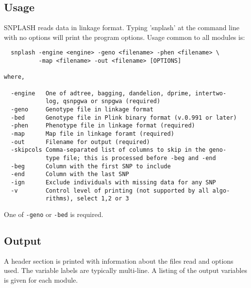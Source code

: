 \subsection{Usage}
SNPLASH reads data in linkage format. Typing 'snplash' at the command line with
no options will print the program options. Usage common to all modules is:

\begin{verbatim}
  snplash -engine <engine> -geno <filename> -phen <filename> \
          -map <filename> -out <filename> [OPTIONS]

where,

  -engine   One of adtree, bagging, dandelion, dprime, intertwo-
            log, qsnpgwa or snpgwa (required)
  -geno     Genotype file in linkage format
  -bed      Genotype file in Plink binary format (v.0.991 or later)
  -phen     Phenotype file in linkage format (required)
  -map      Map file in linkage foramt (required)
  -out      Filename for output (required)
  -skipcols Comma-separated list of columns to skip in the geno-
            type file; this is processed before -beg and -end
  -beg      Column with the first SNP to include
  -end      Column with the last SNP
  -ign      Exclude individuals with missing data for any SNP
  -v        Control level of printing (not supported by all algo-
            rithms), select 1,2 or 3
\end{verbatim}                       
      
One of \verb|-geno| or \verb|-bed| is required.

\subsection{Output}

A header section is printed with information about the files read and options
used.  The variable labels are typically multi-line.  A listing of the output
variables is given for each module.
